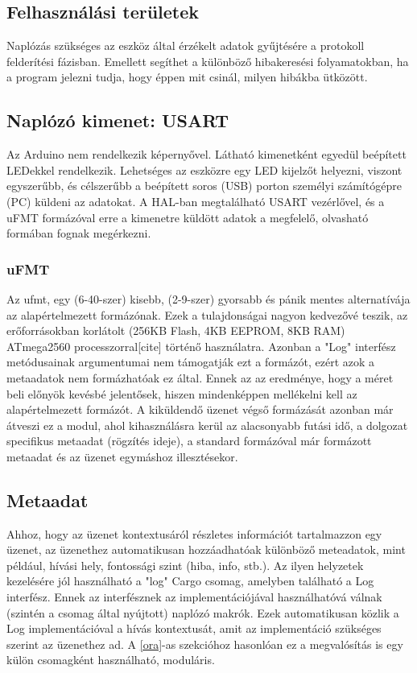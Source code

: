 \subsection{Felhasználási területek}
Naplózás szükséges az eszköz által érzékelt adatok gyűjtésére a protokoll felderítési fázisban.
Emellett segíthet a különböző hibakeresési folyamatokban, ha a program jelezni tudja, hogy éppen mit csinál, milyen hibákba ütközött.

\subsection{Naplózó kimenet: USART}
Az Arduino nem rendelkezik képernyővel. Látható kimenetként egyedül beépített LEDekkel rendelkezik.
Lehetséges az eszközre egy LED kijelzőt helyezni, viszont egyszerűbb, és célszerűbb a beépített soros (USB) porton személyi számítógépre (PC) küldeni az adatokat.
A HAL-ban megtalálható USART vezérlővel, és a uFMT formázóval erre a kimenetre küldött adatok a megfelelő, olvasható formában fognak megérkezni.

\subsubsection{uFMT}
Az ufmt, egy (6-40-szer) kisebb, (2-9-szer) gyorsabb és pánik mentes alternatívája az alapértelmezett formázónak.\cite{ufmt_rust}
Ezek a tulajdonságai nagyon kedvezővé teszik, az erőforrásokban korlátolt (256KB Flash, 4KB EEPROM, 8KB RAM) ATmega2560 processzorral[cite] történő használatra.
Azonban a "Log" interfész metódusainak argumentumai nem támogatják ezt a formázót, ezért azok a metaadatok nem formázhatóak ez által.
Ennek az az eredménye, hogy a méret beli előnyök kevésbé jelentősek, hiszen mindenképpen mellékelni kell az alapértelmezett formázót.
A kiküldendő üzenet végső formázását azonban már átveszi ez a modul, ahol kihasználásra kerül az alacsonyabb futási idő, a dolgozat specifikus metaadat (rögzítés ideje), a standard formázóval már formázott metaadat és az üzenet egymáshoz illesztésekor.

\subsection{Metaadat}
Ahhoz, hogy az üzenet kontextusáról részletes információt tartalmazzon egy üzenet, az üzenethez automatikusan hozzáadhatóak különböző meteadatok, mint például, hívási hely, fontossági szint (hiba, info, stb.).
Az ilyen helyzetek kezelésére jól használható a "log" Cargo csomag, amelyben található a Log interfész. 
Ennek az interfésznek az implementációjával használhatóvá válnak (szintén a csomag által nyújtott) naplózó makrók.
Ezek automatikusan közlik a Log implementációval a hívás kontextusát, amit az implementáció szükséges szerint az üzenethez ad.
A \ref{ora}-as szekcióhoz hasonlóan ez a megvalósítás is egy külön csomagként használható, moduláris.

